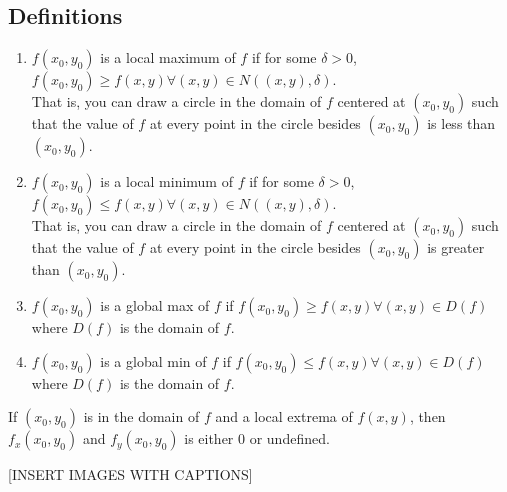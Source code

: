 \subsection{Definitions}
\begin{enumerate}
	\item $f(x_0, y_0)$ is a local maximum of $f$ if for some $\delta>0$, $f(x_0,y_0)\geq f(x,y)\forall(x,y)\in N((x,y),\delta)$.\\ 
	That is, you can draw a circle in the domain of $f$ centered at $(x_0,y_0)$ such that the value of $f$ at every point in the circle besides $(x_0,y_0)$ is less than $(x_0,y_0)$.
	\item $f(x_0,y_0)$ is a local minimum of $f$ if for some $\delta>0$, $f(x_0,y_0)\leq f(x,y)\forall(x,y)\in N((x,y),\delta)$.\\
	That is, you can draw a circle in the domain of $f$ centered at $(x_0,y_0)$ such that the value of $f$ at every point in the circle besides $(x_0,y_0)$ is greater than $(x_0,y_0)$.
	\item $f(x_0,y_0)$ is a global max of $f$ if $f(x_0,y_0)\geq f(x,y)\forall(x,y)\in D(f)$ where $D(f)$ is the domain of $f$.
	\item $f(x_0,y_0)$ is a global min of $f$ if $f(x_0,y_0)\leq f(x,y)\forall(x,y)\in D(f)$ where $D(f)$ is the domain of $f$.
\end{enumerate}
\begin{theorem}
	If $(x_0,y_0)$ is in the domain of $f$ and a local extrema of $f(x,y)$, then $f_x(x_0,y_0)$ and $f_y(x_0,y_0)$ is either 0 or undefined.
\end{theorem}

[INSERT IMAGES WITH CAPTIONS]